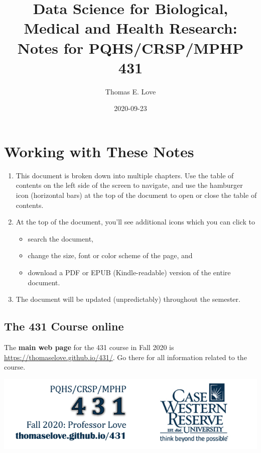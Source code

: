 \documentclass[
]{book}
\title{Data Science for Biological, Medical and Health Research: Notes for PQHS/CRSP/MPHP 431}
\author{Thomas E. Love}
\date{2020-09-23}
\providecommand{\tightlist}{%
  \setlength{\itemsep}{0pt}\setlength{\parskip}{0pt}}
\begin{document}
\maketitle

{
\setcounter{tocdepth}{1}
\tableofcontents
}
\hypertarget{working-with-these-notes}{%
\chapter*{Working with These Notes}\label{working-with-these-notes}}

\begin{enumerate}
\def\labelenumi{\arabic{enumi}.}
\tightlist
\item
  This document is broken down into multiple chapters. Use the table of contents on the left side of the screen to navigate, and use the hamburger icon (horizontal bars) at the top of the document to open or close the table of contents.
\item
  At the top of the document, you'll see additional icons which you can click to

  \begin{itemize}
  \tightlist
  \item
    search the document,
  \item
    change the size, font or color scheme of the page, and
  \item
    download a PDF or EPUB (Kindle-readable) version of the entire document.
  \end{itemize}
\item
  The document will be updated (unpredictably) throughout the semester.
\end{enumerate}

\hypertarget{the-431-course-online}{%
\section*{The 431 Course online}\label{the-431-course-online}}

The \textbf{main web page} for the 431 course in Fall 2020 is \url{https://thomaselove.github.io/431/}. Go there for all information related to the course.

\begin{center}\includegraphics[width=0.8\linewidth]{figures/431_foot2} \end{center}
\end{document}
